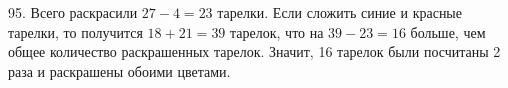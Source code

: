 95. Всего раскрасили $27-4=23$ тарелки. Если сложить синие и красные тарелки, то получится $18+21=39$ тарелок, что на $39-23=16$ больше, чем общее количество раскрашенных тарелок. Значит, 16 тарелок были посчитаны 2 раза и раскрашены обоими цветами.\\
